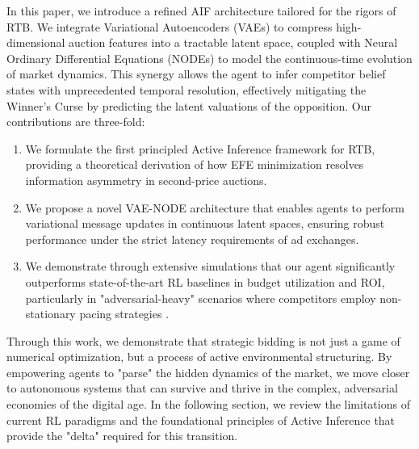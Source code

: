 In this paper, we introduce a refined AIF architecture tailored for the rigors of RTB. We integrate Variational Autoencoders (VAEs) to compress high-dimensional auction features into a tractable latent space, coupled with Neural Ordinary Differential Equations (NODEs) to model the continuous-time evolution of market dynamics. This synergy allows the agent to infer competitor belief states with unprecedented temporal resolution, effectively mitigating the Winner's Curse by predicting the latent valuations of the opposition. Our contributions are three-fold:
\begin{enumerate}
    \item We formulate the first principled Active Inference framework for RTB, providing a theoretical derivation of how EFE minimization resolves information asymmetry in second-price auctions.
    \item We propose a novel VAE-NODE architecture that enables agents to perform variational message updates \cite{ref_new_RealizingSynthe} in continuous latent spaces, ensuring robust performance under the strict latency requirements of ad exchanges.
    \item We demonstrate through extensive simulations that our agent significantly outperforms state-of-the-art RL baselines in budget utilization and ROI, particularly in "adversarial-heavy" scenarios where competitors employ non-stationary pacing strategies \cite{ref_new_AdaptiveActiveI}.
\end{enumerate}

Through this work, we demonstrate that strategic bidding is not just a game of numerical optimization, but a process of active environmental structuring. By empowering agents to "parse" the hidden dynamics of the market, we move closer to autonomous systems that can survive and thrive in the complex, adversarial economies of the digital age. In the following section, we review the limitations of current RL paradigms and the foundational principles of Active Inference that provide the "delta" required for this transition.